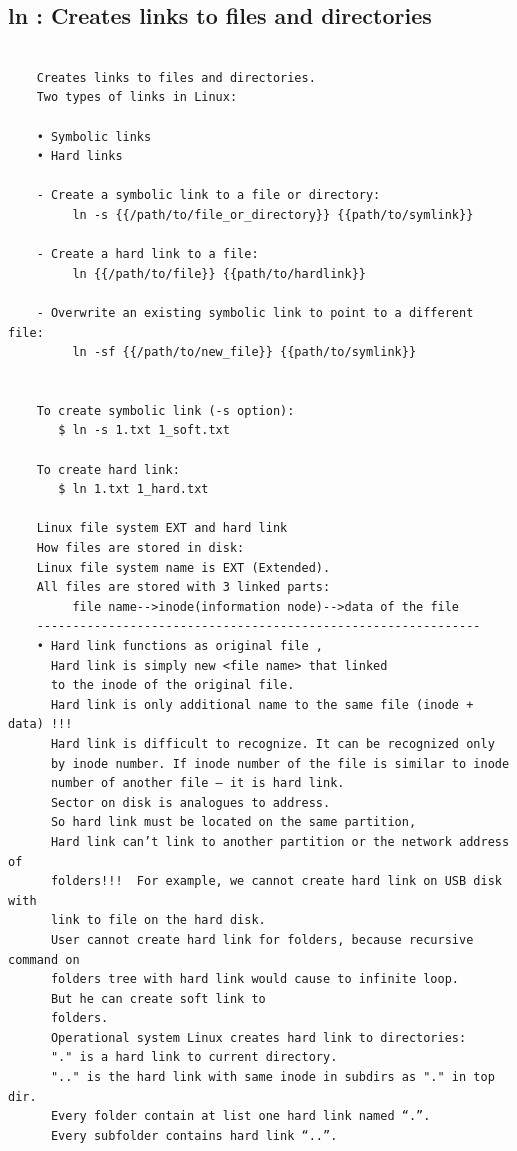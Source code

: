 \documentclass[a4paper,12pt]{article}
\begin{document}
\subsection{ln     : Creates links to files and directories }
\begin{verbatim}
    
    Creates links to files and directories.
    Two types of links in Linux:

    • Symbolic links
    • Hard links

    - Create a symbolic link to a file or directory:
         ln -s {{/path/to/file_or_directory}} {{path/to/symlink}}

    - Create a hard link to a file:
         ln {{/path/to/file}} {{path/to/hardlink}}
         
    - Overwrite an existing symbolic link to point to a different file:
         ln -sf {{/path/to/new_file}} {{path/to/symlink}}     
         

    To create symbolic link (-s option):
       $ ln -s 1.txt 1_soft.txt

    To create hard link: 
       $ ln 1.txt 1_hard.txt

    Linux file system EXT and hard link
    How files are stored in disk: 
    Linux file system name is EXT (Extended). 
    All files are stored with 3 linked parts: 
         file name-->inode(information node)-->data of the file
    --------------------------------------------------------------
    • Hard link functions as original file , 
      Hard link is simply new <file name> that linked 
      to the inode of the original file. 
      Hard link is only additional name to the same file (inode + data) !!!
      Hard link is difficult to recognize. It can be recognized only 
      by inode number. If inode number of the file is similar to inode
      number of another file – it is hard link.
      Sector on disk is analogues to address.
      So hard link must be located on the same partition, 
      Hard link can’t link to another partition or the network address of     
      folders!!!  For example, we cannot create hard link on USB disk with 
      link to file on the hard disk.
      User cannot create hard link for folders, because recursive command on 
      folders tree with hard link would cause to infinite loop.
      But he can create soft link to 
      folders. 
      Operational system Linux creates hard link to directories:
      "." is a hard link to current directory.
      ".." is the hard link with same inode in subdirs as "." in top dir.
      Every folder contain at list one hard link named “.”. 
      Every subfolder contains hard link “..”.
      

\end{verbatim}
\end{document}
